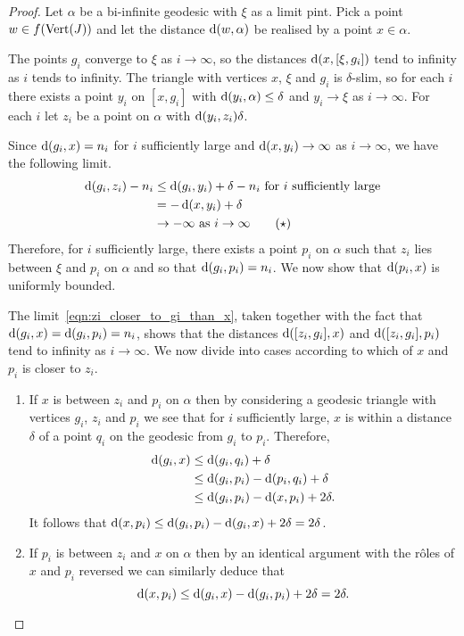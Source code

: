 \documentclass[a4paper]{article}
\begin{document}
\begin{proof}
  Let $\alpha$ be a bi-infinite geodesic with $\xi$ as a limit pint. Pick a
  point $w \in f(\operatorname{Vert}(J))$ and let the distance $\operatorname{d}(w,\alpha)$ be
  realised by a point $x \in \alpha$.

  The points $g_i$ converge to $\xi$ as $i\to\infty$, so the distances
  $\operatorname{d}(x, [\xi, g_i])$ tend to infinity as $i$ tends to infinity. The
  triangle with vertices $x$, $\xi$ and $g_i$ is $\delta$-slim, so for each $i$
  there exists a point $y_i$ on $[x, g_i]$ with $\operatorname{d}(y_i, \alpha) \leq
  \delta$ and $y_i\to\xi$ as $i\to\infty$.  For each $i$ let $z_i$ be a point
  on $\alpha$ with $\operatorname{d}(y_i, z_i) \delta$.

  Since $\operatorname{d}(g_i, x) = n_i$ for $i$ sufficiently large and $\operatorname{d}(x,y_i) \to
  \infty$ as $i\to\infty$, we have the following limit.
  \begin{align*}\label{eqn:zi_closer_to_gi_than_x}
    \operatorname{d}(g_i,z_i) - n_i &\leq \operatorname{d}(g_i,y_i) + \delta - n_i \text{ for $i$
                                        sufficiently large} \\
                         &= - \operatorname{d}(x,y_i) + \delta \\
                         &\to -\infty\text{ as $i \to \infty$} \tag{$\star$}
  \end{align*}
  Therefore, for $i$ sufficiently large, there exists a point $p_i$ on $\alpha$
  such that $z_i$ lies between $\xi$ and $p_i$ on $\alpha$ and so that
  $\operatorname{d}(g_i,p_i)=n_i$. We now show that $\operatorname{d}(p_i, x)$ is uniformly bounded.

  The limit~\eqref{eqn:zi_closer_to_gi_than_x}, taken together with the fact
  that $\operatorname{d}(g_i, x) = \operatorname{d}(g_i, p_i) = n_i$, shows that the distances
  $\operatorname{d}([z_i, g_i], x)$ and $\operatorname{d}([z_i, g_i], p_i)$ tend to infinity as
  $i\to\infty$.  We now divide into cases according to which of $x$ and $p_i$
  is closer to $z_i$.
  \begin{enumerate}
    \item If $x$ is between $z_i$ and $p_i$ on $\alpha$ then by considering a
      geodesic triangle with vertices $g_i$, $z_i$ and $p_i$ we see that for
      $i$ sufficiently large, $x$ is within a distance $\delta$ of a point
      $q_i$ on the geodesic from $g_i$ to $p_i$.  Therefore,
      \begin{align*}
        \operatorname{d}(g_i,x)&\leq \operatorname{d}(g_i,q_i)+\delta\\
                        &\leq \operatorname{d}(g_i,p_i)-\operatorname{d}(p_i,q_i)+\delta\\
                        &\leq \operatorname{d}(g_i,p_i)-\operatorname{d}(x,p_i)+2\delta.
      \end{align*}
      It follows that $\operatorname{d}(x,p_i) \leq \operatorname{d}(g_i,p_i)-\operatorname{d}(g_i,x)+2\delta
      = 2\delta$.
    \item If $p_i$ is between $z_i$ and $x$ on $\alpha$ then by an identical 
      argument with the r\^oles of $x$ and $p_i$ reversed we can similarly 
      deduce that 
      \begin{equation*}
        \operatorname{d}(x,p_i)\leq\operatorname{d}(g_i,x) - \operatorname{d}(g_i,p_i) + 2\delta =2\delta.
      \end{equation*}
  \end{enumerate}


\end{proof}
\end{document}
